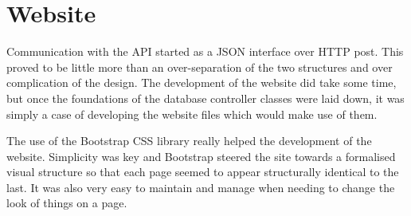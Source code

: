 \section{Website}
	Communication with the API started as a JSON interface over HTTP post. This proved to be little more than an over-separation of the two structures and over complication of the design. The development of the website did take some time, but once the foundations of the database controller classes were laid down, it was simply a case of developing the website files which would make use of them.
	
	The use of the Bootstrap CSS library really helped the development of the website. Simplicity was key and Bootstrap steered the site towards a formalised visual structure so that each page seemed to appear structurally identical to the last. It was also very easy to maintain and manage when needing to change the look of things on a page.

